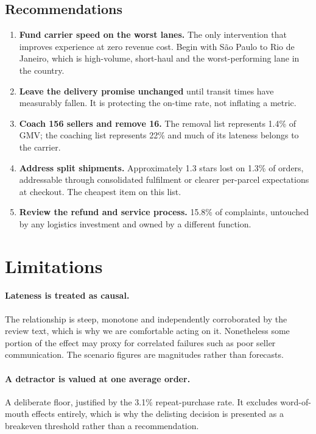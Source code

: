 \documentclass[11pt,a4paper]{article}
\begin{document}
\subsection{Recommendations}

\begin{enumerate}[leftmargin=*,itemsep=0.45em]
  \item \textbf{Fund carrier speed on the worst lanes.} The only intervention that
        improves experience at zero revenue cost. Begin with S\~{a}o Paulo to Rio
        de Janeiro, which is high-volume, short-haul and the worst-performing lane
        in the country.
  \item \textbf{Leave the delivery promise unchanged} until transit times have
        measurably fallen. It is protecting the on-time rate, not inflating a
        metric.
  \item \textbf{Coach 156 sellers and remove 16.} The removal list represents 1.4\%
        of GMV; the coaching list represents 22\%  and much of its lateness belongs
        to the carrier.
  \item \textbf{Address split shipments.} Approximately 1.3 stars lost on 1.3\% of
        orders, addressable through consolidated fulfilment or clearer per-parcel
        expectations at checkout. The cheapest item on this list.
  \item \textbf{Review the refund and service process.} 15.8\% of complaints,
        untouched by any logistics investment and owned by a different function.
\end{enumerate}

\section{Limitations}

\paragraph{Lateness is treated as causal.} The relationship is steep, monotone and
independently corroborated by the review text, which is why we are comfortable
acting on it. Nonetheless some portion of the effect may proxy for correlated
failures such as poor seller communication. The scenario figures are magnitudes
rather than forecasts.

\paragraph{A detractor is valued at one average order.} A deliberate floor,
justified by the 3.1\% repeat-purchase rate. It excludes word-of-mouth effects
entirely, which is why the delisting decision is presented as a breakeven threshold
rather than a recommendation.
\end{document}
